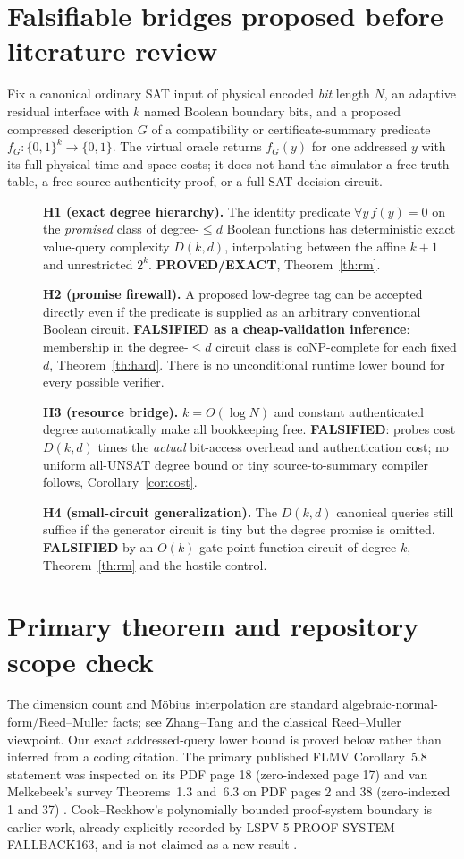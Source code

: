 \documentclass[11pt]{article}
\begin{document}
\section{Falsifiable bridges proposed before literature review}
Fix a canonical ordinary SAT input of physical encoded \emph{bit} length $N$, an adaptive residual interface with $k$ named Boolean boundary bits, and a proposed compressed description $G$ of a compatibility or certificate-summary predicate $f_G:\{0,1\}^k\to\{0,1\}$. The virtual oracle returns $f_G(y)$ for one addressed $y$ with its full physical time and space costs; it does not hand the simulator a free truth table, a free source-authenticity proof, or a full SAT decision circuit.
\begin{description}
\item[] \textbf{H1 (exact degree hierarchy).} The identity predicate $\forall y\,f(y)=0$ on the \emph{promised} class of degree-$\le d$ Boolean functions has deterministic exact value-query complexity $D(k,d)$, interpolating between the affine $k+1$ and unrestricted $2^k$. \textbf{PROVED/EXACT}, Theorem~\ref{th:rm}.
\item[] \textbf{H2 (promise firewall).} A proposed low-degree tag can be accepted directly even if the predicate is supplied as an arbitrary conventional Boolean circuit. \textbf{FALSIFIED as a cheap-validation inference}: membership in the degree-$\le d$ circuit class is coNP-complete for each fixed $d$, Theorem~\ref{th:hard}. There is no unconditional runtime lower bound for every possible verifier.
\item[] \textbf{H3 (resource bridge).} $k=O(\log N)$ and constant authenticated degree automatically make all bookkeeping free. \textbf{FALSIFIED}: probes cost $D(k,d)$ times the \emph{actual} bit-access overhead and authentication cost; no uniform all-UNSAT degree bound or tiny source-to-summary compiler follows, Corollary~\ref{cor:cost}.
\item[] \textbf{H4 (small-circuit generalization).} The $D(k,d)$ canonical queries still suffice if the generator circuit is tiny but the degree promise is omitted. \textbf{FALSIFIED} by an $O(k)$-gate point-function circuit of degree $k$, Theorem~\ref{th:rm} and the hostile control.
\end{description}

\section{Primary theorem and repository scope check}
The dimension count and M\"obius interpolation are standard algebraic-normal-form/Reed--Muller facts; see Zhang--Tang \cite{zhang} and the classical Reed--Muller viewpoint. Our exact addressed-query lower bound is proved below rather than inferred from a coding citation. The primary published FLMV Corollary~5.8 statement was inspected on its PDF page 18 (zero-indexed page 17) and van Melkebeek's survey Theorems~1.3 and~6.3 on PDF pages 2 and 38 (zero-indexed 1 and 37) \cite{flmv,vm}. Cook--Reckhow's polynomially bounded proof-system boundary is earlier work, already explicitly recorded by LSPV-5 PROOF-SYSTEM-FALLBACK163, and is not claimed as a new result \cite{cook}.
\end{document}
